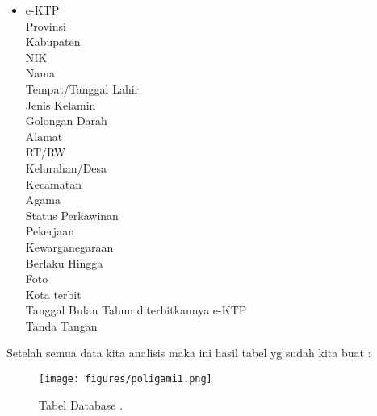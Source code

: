 \begin{itemize}
	\item e-KTP\\
		Provinsi\\
		Kabupaten\\
		NIK\\
		Nama\\
		Tempat/Tanggal Lahir\\
		Jenis Kelamin\\
		Golongan Darah\\
		Alamat\\
		RT/RW\\
		Kelurahan/Desa\\
		Kecamatan\\
		Agama\\
		Status Perkawinan\\
		Pekerjaan\\
		Kewarganegaraan\\
		Berlaku Hingga\\
		Foto\\
		Kota terbit\\
		Tanggal Bulan Tahun diterbitkannya e-KTP\\
		Tanda Tangan\\

\end{itemize}
Setelah semua data kita analisis maka ini hasil tabel yg sudah kita buat :

\begin{figure}[H]
	\centering
	\texttt{[image: figures/poligami1.png]}
	\caption{Tabel Database .}	
\end{figure}